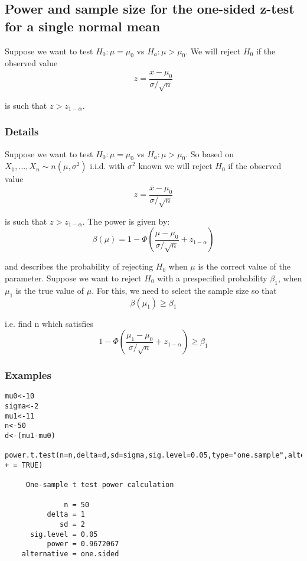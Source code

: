 \documentclass[12pt,a4paper]{article}
\theoremstyle{regla}
\theoremstyle{remark}
\theoremstyle{definition}
\theoremstyle{nonumberbreak}
\begin{document}
\subsection{Power and sample size for the one-sided z-test for a single normal mean}
\begin{fbox}
\begin{minipage}{0.97\textwidth}
Suppose we want to test $H_0:\mu=\mu_0$ vs $H_a:\mu>\mu_0$. We will reject $H_0$ if the observed value $$z=\frac{\overline{x}-\mu_0}{\sigma/\sqrt{n}}$$

is such that $z>z_{1-\alpha}$. 

\end{minipage}
\end{fbox}
\subsubsection{Details}
Suppose we want to test $H_0:\mu=\mu_0$ vs $H_a:\mu>\mu_0$. So based on $X_1,...,X_n\sim n(\mu,\sigma ^2)$ i.i.d. with $\sigma^2$ known we will reject $H_0$ if the observed value $$z=\frac{\overline{x}-\mu_0}{\sigma/\sqrt{n}}$$

is such that $z>z_{1-\alpha}$. The power is given by: $$\beta(\mu)=1-\Phi(\frac{\mu-\mu_0}{\sigma/\sqrt{n}}+z_{1-\alpha})$$

and describes the probability of rejecting $H_0$ when $\mu$ is the correct value of the parameter. Suppose we want to reject $H_0$ with a prespecified probability $\beta_1$, when $\mu_1$ is the true value of $\mu$. For this, we need to select the sample size so that 
$$\beta(\mu_1) \geq \beta_1$$

i.e. find n which satisfies
$$1-\Phi(\frac{\mu_1-\mu_0}{\sigma/\sqrt{n}}+z_{1-\alpha})\geq \beta_1$$

\subsubsection{Examples}
\begin{xmpl}
\begin{lstlisting}
mu0<-10
sigma<-2
mu1<-11
n<-50
d<-(mu1-mu0)

power.t.test(n=n,delta=d,sd=sigma,sig.level=0.05,type="one.sample",alternative="one.sided",strict
+ = TRUE)

     One-sample t test power calculation 

              n = 50
          delta = 1
             sd = 2
      sig.level = 0.05
          power = 0.9672067
    alternative = one.sided
\end{lstlisting}
\end{xmpl}
\end{document}
